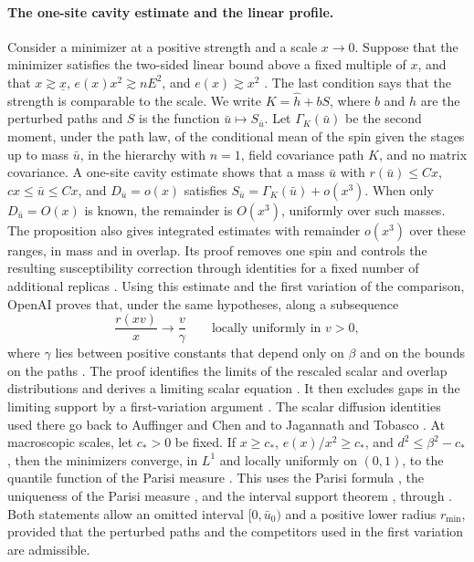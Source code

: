 \paragraph{The one-site cavity estimate and the linear profile.} Consider a minimizer at a positive strength and a scale $x\to0$. Suppose that the minimizer satisfies the two-sided linear bound above a fixed multiple of $x$, and that $x\gtrsim\underline x$, $e(x)x^2\gtrsim nE^2$, and $e(x)\gtrsim x^2$ \cite[Section~4, opening]{oai-fluctuations}. The last condition says that the strength is comparable to the scale. We write $K={\widehat h}+bS$, where $b$ and ${\widehat h}$ are the perturbed paths and $S$ is the function ${\bar u}\mapsto S_{\bar u}$. Let $\Gamma_K({\bar u})$ be the second moment, under the path law, of the conditional mean of the spin given the stages up to mass ${\bar u}$, in the hierarchy with $n=1$, field covariance path $K$, and no matrix covariance. A one-site cavity estimate \cite[Proposition~4.1]{oai-fluctuations} shows that a mass ${\bar u}$ with $r({\bar u})\le Cx$, $cx\le {\bar u}\le Cx$, and $D_{\bar u}=o(x)$ satisfies $S_{\bar u}=\Gamma_K({\bar u})+o(x^3)$. When only $D_{\bar u}=O(x)$ is known, the remainder is $O(x^3)$, uniformly over such masses. The proposition also gives integrated estimates with remainder $o(x^3)$ over these ranges, in mass and in overlap. Its proof removes one spin and controls the resulting susceptibility correction through identities for a fixed number of additional replicas \cite[Sections~4.1--4.5]{oai-fluctuations}. Using this estimate and the first variation of the comparison, OpenAI proves that, under the same hypotheses, along a subsequence
\[
 \frac{r(xv)}{x}\longrightarrow\frac v\gamma\qquad\text{locally uniformly in }v>0,
\]
where $\gamma$ lies between positive constants that depend only on $\beta$ and on the bounds on the paths \cite[Theorem~5.1]{oai-fluctuations}. The proof identifies the limits of the rescaled scalar and overlap distributions \cite[Lemma~5.4]{oai-fluctuations} and derives a limiting scalar equation \cite[Lemmas~5.3 and~5.5]{oai-fluctuations}. It then excludes gaps in the limiting support by a first-variation argument \cite[Lemma~5.6]{oai-fluctuations}. The scalar diffusion identities used there go back to Auffinger and Chen \cite[Proposition~3]{auffinger-chen-2015} and to Jagannath and Tobasco \cite[Lemma~8.4]{jagannath-tobasco-2017}. At macroscopic scales, let $c_*>0$ be fixed. If $x\ge c_*$, $e(x)/x^2\ge c_*$, and $d^2\le\beta^2-c_*$, then the minimizers converge, in $L^1$ and locally uniformly on $(0,1)$, to the quantile function of the Parisi measure \cite[Proposition~5.9]{oai-fluctuations}. This uses the Parisi formula \cite{parisi-formula}, the uniqueness of the Parisi measure \cite{auffinger-chen-uniqueness-2015}, and the interval support theorem \cite[Theorem~1.1]{full-rsb}, through \cite[Lemma~5.8]{oai-fluctuations}. Both statements allow an omitted interval $[0,{\bar u}_0)$ and a positive lower radius $r_{\min}$, provided that the perturbed paths and the competitors used in the first variation are admissible.

